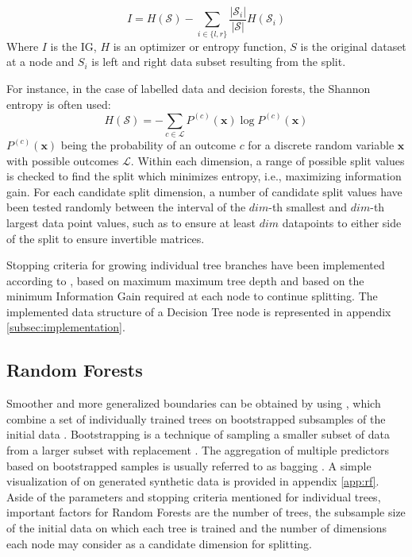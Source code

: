 \documentclass[10pt]{article}
\begin{document}
\begin{equation}
    \label{eq:ig}
    I = H(\mathcal{S})-\sum_{i\in \{l,r\}}\frac{|\mathcal{S}_i|}{|\mathcal{S}|}H(\mathcal{S}_i)
\end{equation}
Where $I$ is the \acrlong{IG}, $H$ is an optimizer or entropy function, $S$ is the original dataset at a node and $S_i$ is left and right data subset resulting from the split.

For instance, in the case of labelled data and decision forests, the Shannon entropy is often used:
\begin{equation}
    H(\mathcal{S}) = -\sum_{c\in \mathcal{L}}P^{(c)}(\mathbf{x})\log P^{(c)}(\mathbf{x})
\end{equation}
$P^{(c)}(\mathbf{x})$ being the probability of an outcome $c$ for a discrete random variable $\mathbf{x}$ with possible outcomes $\mathcal{L}$. Within each dimension, a range of possible split values is checked to find the split which minimizes entropy, i.e., maximizing information gain. For each candidate split dimension, a number of candidate split values have been tested randomly between the interval of the $dim$-th smallest and $dim$-th largest data point values, such as to ensure at least $dim$ datapoints to either side of the split to ensure invertible matrices.

Stopping criteria for growing individual tree branches have been implemented according to \cite{decisionForests-MSR}, based on maximum maximum tree depth and based on the minimum Information Gain required at each node to continue splitting. The implemented data structure of a Decision Tree node is represented in appendix \ref{subsec:implementation}.

\subsection{Random Forests}
Smoother and more generalized boundaries can be obtained by using , which combine a set of individually trained trees on bootstrapped subsamples of the initial data \cite{decisionForests-MSR, Breiman2001}. Bootstrapping is a technique of sampling a smaller subset of data from a larger subset with replacement \cite{Zoubir2007BootstrapMA}. The aggregation of multiple predictors based on bootstrapped samples is usually referred to as bagging \cite{Breiman1996BaggingP}. A simple visualization of  on generated synthetic data is provided in appendix \ref{app:rf}. Aside of the parameters and stopping criteria mentioned for individual trees, important factors for Random Forests are the number of trees, the subsample size of the initial data on which each tree is trained and the number of dimensions each node may consider as a candidate dimension for splitting.
\end{document}
